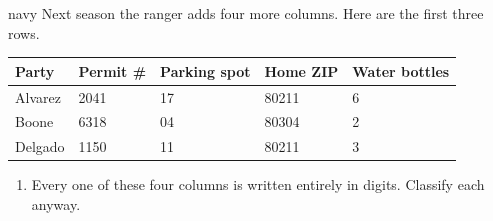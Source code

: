 \documentclass[10pt]{article}
\begin{document}
\vspace{0.07in}

\boxguard[26]
\begin{scenariobox}{navy}
\small
Next season the ranger adds four more columns. Here are the first three rows.

\vspace{5pt}
\renewcommand{\arraystretch}{1.1}
\begin{tabularx}{\linewidth}{@{} l Y Y Y Y @{}}
\textbf{Party} & \textbf{Permit \#} & \textbf{Parking spot} & \textbf{Home ZIP} &
\textbf{Water bottles} \\
\hline
Alvarez & 2041 & 17 & 80211 & 6 \\
Boone   & 6318 & 04 & 80304 & 2 \\
Delgado & 1150 & 11 & 80211 & 3 \\
\hline
\end{tabularx}

\vspace{6pt}
\begin{enumerate}[label=\textbf{\alph*.}, leftmargin=1.8em, itemsep=5pt]
  \item Every one of these four columns is written entirely in digits. Classify each anyway.


\end{enumerate}
\end{scenariobox}
\end{document}
